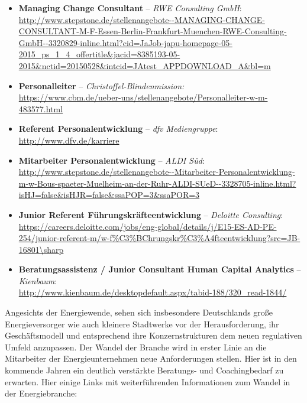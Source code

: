\documentclass[11pt,a4paper]{article}
\begin{document}
\begin{itemize}

\item \textbf{Managing Change Consultant} -- \textsl{RWE Consulting GmbH}:\\ \textsf{\textcolor{MidnightBlue}{\url{http://www.stepstone.de/stellenangebote--MANAGING-CHANGE-CONSULTANT-M-F-Essen-Berlin-Frankfurt-Muenchen-RWE-Consulting-GmbH--3320829-inline.html?cid=JaJob-japu-homepage-05-2015_ps_1_4_offertitle&jacid=8385193-05-2015&nctid=20150528&intcid=JAtest_APPDOWNLOAD_A&bl=m}}}

\item \textbf{Personalleiter} -- \textsl{Christoffel-Blindenmission:}\\
\textsf{\textcolor{MidnightBlue}{\url{https://www.cbm.de/ueber-uns/stellenangebote/Personalleiter-w-m-483577.html}}}

\item \textbf{Referent Personalentwicklung} -- \textsl{dfv Mediengruppe}:\\
\textsf{\textcolor{MidnightBlue}{\url{http://www.dfv.de/karriere}}}

\item \textbf{Mitarbeiter Personalentwicklung} -- \textsl{ALDI Süd}:\\
\textsf{\textcolor{MidnightBlue}{\url{http://www.stepstone.de/stellenangebote--Mitarbeiter-Personalentwicklung-m-w-Bous-spaeter-Muelheim-an-der-Ruhr-ALDI-SUeD--3328705-inline.html?isHJ=false\&isHJR=false&ssaPOP=3\&ssaPOR=3}}}

\item \textbf{Junior Referent Führungskräfteentwicklung} -- \textsl{Deloitte Consulting}:\\
\textsf{\textcolor{MidnightBlue}{\url{https://careers.deloitte.com/jobs/eng-global/details/j/E15-ES-AD-PE-254/junior-referent-m/w-f\%C3\%BChrungskr\%C3\%A4fteentwicklung?src=JB-16801\sharp}}}

\item \textbf{Beratungsassistenz / Junior Consultant Human Capital Analytics} -- \textsl{Kienbaum}:\\
\textsf{\textcolor{MidnightBlue}{\url{http://www.kienbaum.de/desktopdefault.aspx/tabid-188/320_read-1844/}}}

\end{itemize}


Angesichts der Energiewende, sehen sich insbesondere Deutschlands große Energieversorger wie auch kleinere Stadtwerke vor der Herausforderung, ihr Geschäftsmodell und entsprechend ihre Konzernstrukturen dem neuen regulativen Umfeld anzupassen. Der Wandel der Branche wird in erster Linie an die Mitarbeiter der Energieunternehmen neue Anforderungen stellen. Hier ist in den kommende Jahren ein deutlich verstärkte Beratungs- und Coachingbedarf zu erwarten. Hier einige Links mit weiterführenden Informationen zum Wandel in der Energiebranche:
\end{document}
